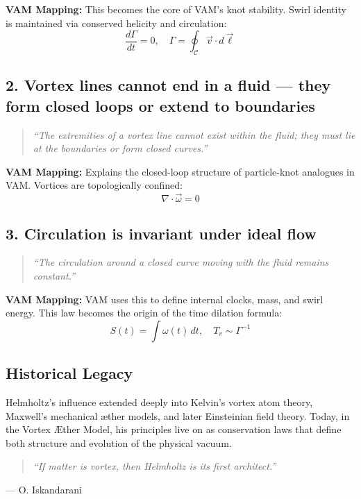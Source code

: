 \documentclass[preprint]{revtex4-2}
\begin{document}
    \textbf{VAM Mapping:} This becomes the core of VAM’s knot stability. Swirl identity is maintained via conserved helicity and circulation:
    \[
    \frac{d\Gamma}{dt} = 0, \quad \Gamma = \oint_{\mathcal{C}} \vec{v} \cdot d\vec{\ell}
    \]

    \subsection*{2. Vortex lines cannot end in a fluid — they form closed loops or extend to boundaries}
    \begin{quote}
    \textit{“The extremities of a vortex line cannot exist within the fluid; they must lie at the boundaries or form closed curves.”}
    \end{quote}

    \textbf{VAM Mapping:} Explains the closed-loop structure of particle-knot analogues in VAM. Vortices are topologically confined:
    \[
    \nabla \cdot \vec{\omega} = 0
    \]

    \subsection*{3. Circulation is invariant under ideal flow}
    \begin{quote}
    \textit{“The circulation around a closed curve moving with the fluid remains constant.”}
    \end{quote}

    \textbf{VAM Mapping:} VAM uses this to define internal clocks, mass, and swirl energy. This law becomes the origin of the time dilation formula:
    \[
    S(t) = \int \omega(t) \, dt, \quad T_v \sim \Gamma^{-1}
    \]

    \subsection*{Historical Legacy}

    Helmholtz's influence extended deeply into Kelvin’s vortex atom theory, Maxwell’s mechanical æther models, and later Einsteinian field theory. Today, in the Vortex Æther Model, his principles live on as conservation laws that define both structure and evolution of the physical vacuum.

    \begin{quote}
    \textit{“If matter is vortex, then Helmholtz is its first architect.”}
    \end{quote}
   \hfill — O. Iskandarani
\end{document}
